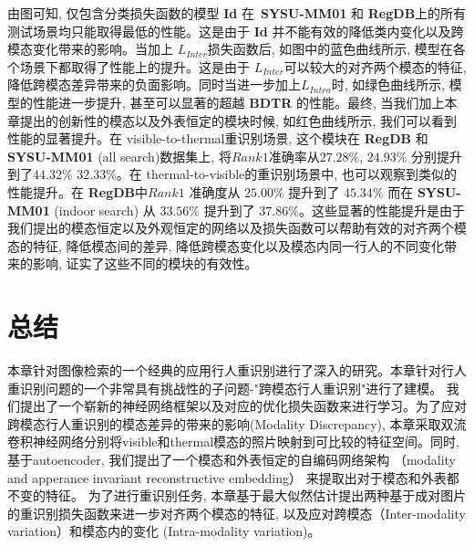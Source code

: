由图可知, 仅包含分类损失函数的模型 \textbf{Id} 在~\textbf{SYSU-MM01} 和 \textbf{RegDB}上的所有测试场景均只能取得最低的性能。这是由于 \textbf{Id} 并不能有效的降低类内变化以及跨模态变化带来的影响。当加上 $L_{Inter}$损失函数后, 如图中的蓝色曲线所示, 模型在各个场景下都取得了性能上的提升。这是由于 $L_{Inter}$可以较大的对齐两个模态的特征, 降低跨模态差异带来的负面影响。同时当进一步加上$L_{Intra}$时, 如绿色曲线所示, 模型的性能进一步提升, 甚至可以显著的超越 \textbf{BDTR} 的性能。最终, 当我们加上本章提出的创新性的模态以及外表恒定的模块时候, 如红色曲线所示, 我们可以看到性能的显著提升。在 visible-to-thermal重识别场景, 这个模块在 \textbf{RegDB} 和 \textbf{SYSU-MM01} (all search)数据集上, 将$Rank1$准确率从$27.28 \%$, $24.93 \%$ 分别提升到了$44.32\%$ $32.33 \%$。在 thermal-to-visible的重识别场景中, 也可以观察到类似的性能提升。在 \textbf{RegDB}中$Rank1$ 准确度从 $25.00 \%$ 提升到了 $45.34 \%$ 而在 \textbf{SYSU-MM01} (indoor search) 从 $33.56 \%$ 提升到了 $37.86 \%$。这些显著的性能提升是由于我们提出的模态恒定以及外观恒定的网络以及损失函数可以帮助有效的对齐两个模态的特征, 降低模态间的差异, 降低跨模态变化以及模态内同一行人的不同变化带来的影响, 证实了这些不同的模块的有效性。

\section{总结}
本章针对图像检索的一个经典的应用行人重识别进行了深入的研究。本章针对行人重识别问题的一个非常具有挑战性的子问题-"跨模态行人重识别"进行了建模。 我们提出了一个崭新的神经网络框架以及对应的优化损失函数来进行学习。为了应对跨模态行人重识别的模态差异的带来的影响(Modality Discrepancy), 本章采取双流卷积神经网络分别将visible和thermal模态的照片映射到可比较的特征空间。同时, 基于autoencoder, 我们提出了一个模态和外表恒定的自编码网络架构 （modality and apperance invariant reconstructive embedding） 来提取出对于模态和外表都不变的特征。 为了进行重识别任务, 本章基于最大似然估计提出两种基于成对图片的重识别损失函数来进一步对齐两个模态的特征, 以及应对跨模态（Inter-modality variation）和模态内的变化 (Intra-modality variation)。
